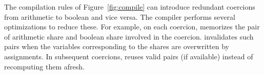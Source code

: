 The compilation rules of Figure~\ref{fig:compile} can introduce redundant coercions from arithmetic to
boolean  and vice versa.
The \tool compiler performs several optimizations to reduce these.
For example, on each coercion, \tool memorizes the pair of arithmetic share and boolean share involved in the coercion.
\tool invalidates such pairs when the variables corresponding to the shares are overwritten by assignments.
In subsequent coercions, \tool  reuses valid pairs (if available) instead of recomputing them afresh. 

 